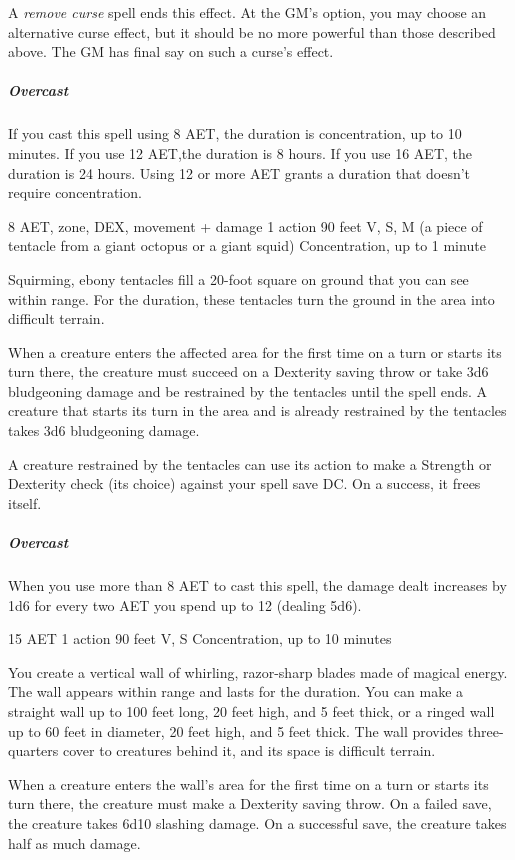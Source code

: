 A \textit{remove curse} spell ends this effect. At the GM's option, you may choose an alternative curse effect, but it should be no more powerful than those described above. The GM has final say on such a curse's effect.

\subparagraph*{Overcast} If you cast this spell using 8 AET, the duration is concentration, up to 10 minutes. If you use 12 AET,the duration is 8 hours. If you use 16 AET, the duration is 24 hours. Using 12 or more AET grants a duration that doesn't require concentration.


{8 AET, zone, DEX, movement + damage}
{1 action}
{90 feet}
{V, S, M (a piece of tentacle from a giant octopus or a giant squid)}
{Concentration, up to 1 minute}

Squirming, ebony tentacles fill a 20-foot square on ground that you can see within range. For the duration, these tentacles turn the ground in the area into difficult terrain.

When a creature enters the affected area for the first time on a turn or starts its turn there, the creature must succeed on a Dexterity saving throw or take 3d6 bludgeoning damage and be restrained by the tentacles until the spell ends. A creature that starts its turn in the area and is already restrained by the tentacles takes 3d6 bludgeoning damage.

A creature restrained by the tentacles can use its action to make a Strength or Dexterity check (its choice) against your spell save DC. On a success, it frees itself.
\subparagraph*{Overcast} When you use more than 8 AET to cast this spell, the damage dealt increases by 1d6 for every two AET you spend up to 12 (dealing 5d6).

{15 AET}
{1 action}
{90 feet}
{V, S}
{Concentration, up to 10 minutes}

You create a vertical wall of whirling, razor-sharp blades made of magical energy. The wall appears within range and lasts for the duration. You can make a straight wall up to 100 feet long, 20 feet high, and 5 feet thick, or a ringed wall up to 60 feet in diameter, 20 feet high, and 5 feet thick. The wall provides three-quarters cover to creatures behind it, and its space is difficult terrain.

When a creature enters the wall’s area for the first time on a turn or starts its turn there, the creature must make a Dexterity saving throw. On a failed save, the creature takes 6d10 slashing damage. On a successful save, the creature takes half as much damage.


